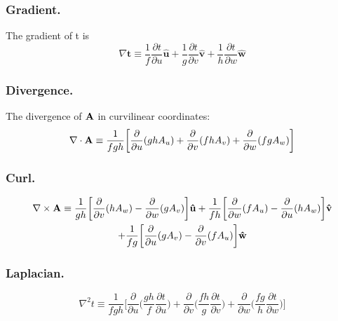\documentclass[../../../main.tex]{subfiles}
\begin{document}
\subsubsection{Gradient.} The gradient of t is
\begin{equation*}
    \nabla \mathbf{t} \equiv \frac{1}{f}\frac{\partial t}{\partial u}\mathbf{\hat{u}}+ \frac{1}{g}\frac{\partial t}{\partial v}\mathbf{\hat{v}}+ \frac{1}{h}\frac{\partial t}{\partial w}\mathbf{\hat{w}}
\end{equation*}

\subsubsection{Divergence.} The divergence of $\mathbf{A}$ in curvilinear coordinates:
\begin{equation*}
    \nabla \cdot \mathbf{A}\equiv \frac{1}{fgh} \biggl[ \frac{\partial}{\partial u} (ghA_u)+ \frac{\partial}{\partial v} (fh A_v)+\frac{\partial}{\partial w} (fg A_w)\biggr]
\end{equation*}

\subsubsection{Curl.}
\begin{multline*}
    \nabla \times \mathbf{A}\equiv \frac{1}{gh} \biggl[\frac{\partial}{\partial v} (hA_w) -\frac{\partial}{\partial w } (g A_{v}) \biggr]\mathbf{\hat{u}}
    +\frac{1}{fh} \biggl[\frac{\partial}{\partial w} (f A_{u}) -\frac{\partial}{\partial u } (h A_{w}) \biggr]\mathbf{\hat{v}}\\
    +\frac{1}{fg} \biggl[\frac{\partial}{\partial u} (g A_{v}) -\frac{\partial}{\partial v } (f A_{u}) \biggr]\mathbf{\hat{w}}
\end{multline*}

\subsubsection{Laplacian.}
\begin{equation*}
    \nabla^2t\equiv \frac{1}{fgh}\biggl[\frac{\partial}{\partial u}\Biggl(\frac{gh}{f}\frac{\partial t}{\partial u}\Biggr)+ \frac{\partial}{\partial v}\Biggl(\frac{fh}{g}\frac{\partial t}{\partial v} \Biggr)+ \frac{\partial}{\partial w}\Biggl(\frac{fg}{h}\frac{\partial t}{\partial w}\Biggr)\biggr]
\end{equation*}
\end{document}
